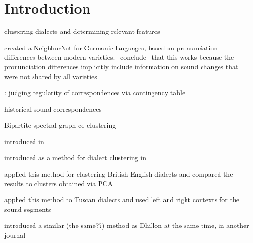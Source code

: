 \documentclass[a4paper]{article}
\begin{document}
\newpage
\tableofcontents
\listoftables
\listoffigures
\newpage



\section{Introduction}


clustering dialects and determining relevant features

\citet{prokic2012detecting}


\citet{heggarty2010splits} created a NeighborNet for Germanic languages, based on pronunciation differences between modern varieties. 
~conclude~ that this works because the pronunciation differences implicitly include information on sound changes that were not shared by all varieties

\citet{prokic2013combining}: judging regularity of correspondences via contingency table


historical sound correspondences



Bipartite spectral graph co-clustering

introduced in \citet{dhillon2001co-clustering}

introduced as a method for dialect clustering in \citet{wieling2011bipartite}

\citet{wieling2013analyzing} applied this method for clustering British English dialects and compared the results to clusters obtained via PCA
 
\citet{montemagni2013synchronic} applied this method to Tuscan dialects and used left and right contexts for the sound segments

\citet{zha2001bipartite} introduced a similar (the same??) method as Dhillon at the same time, in another journal

\end{document}
